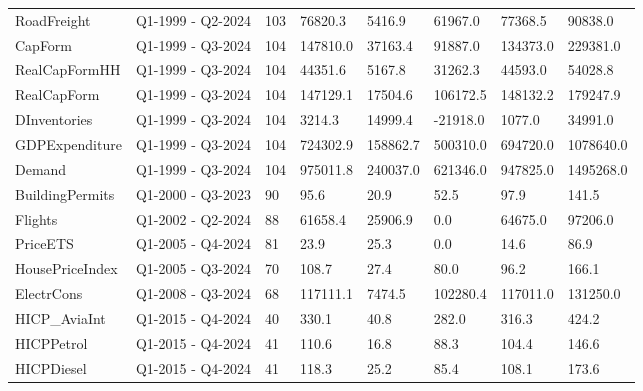 \begin{longtable}[t]{llllllll}
RoadFreight & Q1-1999 - Q2-2024 & 103 & 76820.3 & 5416.9 & 61967.0 & 77368.5 & 90838.0\\
CapForm & Q1-1999 - Q3-2024 & 104 & 147810.0 & 37163.4 & 91887.0 & 134373.0 & 229381.0\\
\addlinespace
RealCapFormHH & Q1-1999 - Q3-2024 & 104 & 44351.6 & 5167.8 & 31262.3 & 44593.0 & 54028.8\\
RealCapForm & Q1-1999 - Q3-2024 & 104 & 147129.1 & 17504.6 & 106172.5 & 148132.2 & 179247.9\\
DInventories & Q1-1999 - Q3-2024 & 104 & 3214.3 & 14999.4 & -21918.0 & 1077.0 & 34991.0\\
GDPExpenditure & Q1-1999 - Q3-2024 & 104 & 724302.9 & 158862.7 & 500310.0 & 694720.0 & 1078640.0\\
Demand & Q1-1999 - Q3-2024 & 104 & 975011.8 & 240037.0 & 621346.0 & 947825.0 & 1495268.0\\
\addlinespace
BuildingPermits & Q1-2000 - Q3-2023 & 90 & 95.6 & 20.9 & 52.5 & 97.9 & 141.5\\
Flights & Q1-2002 - Q2-2024 & 88 & 61658.4 & 25906.9 & 0.0 & 64675.0 & 97206.0\\
PriceETS & Q1-2005 - Q4-2024 & 81 & 23.9 & 25.3 & 0.0 & 14.6 & 86.9\\
HousePriceIndex & Q1-2005 - Q3-2024 & 70 & 108.7 & 27.4 & 80.0 & 96.2 & 166.1\\
ElectrCons & Q1-2008 - Q3-2024 & 68 & 117111.1 & 7474.5 & 102280.4 & 117011.0 & 131250.0\\
\addlinespace
HICP\_AviaInt & Q1-2015 - Q4-2024 & 40 & 330.1 & 40.8 & 282.0 & 316.3 & 424.2\\
HICPPetrol & Q1-2015 - Q4-2024 & 41 & 110.6 & 16.8 & 88.3 & 104.4 & 146.6\\
HICPDiesel & Q1-2015 - Q4-2024 & 41 & 118.3 & 25.2 & 85.4 & 108.1 & 173.6\\
\bottomrule
\end{longtable}
\endgroup{}
